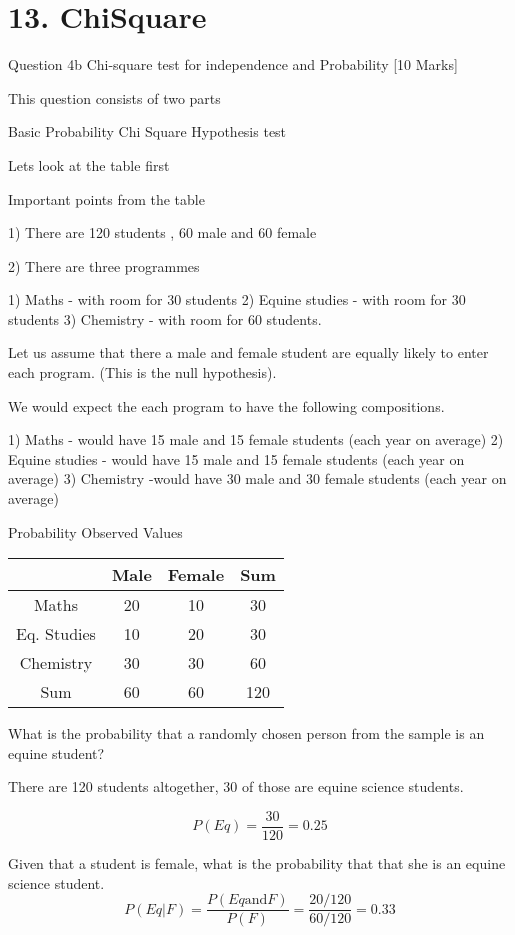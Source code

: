 			\chapter{13. ChiSquare}
			
			
			Question 4b  
			Chi-square test for independence and Probability [10 Marks]
			
			This question consists of two parts
			
			Basic Probability
			Chi Square Hypothesis test
			
			Lets look at the table first
			
			Important points from the table
			
			1) There are 120 students , 60 male and 60 female
			
			2) There are three programmes
			
			1) Maths - with room for 30 students
			2) Equine studies - with room for 30 students
			3) Chemistry - with room for 60 students.
			
			Let us assume that there a male and female student are equally likely to enter each program. (This is the null hypothesis).
			
			We would expect the each program to have the following compositions.
			
			1) Maths - would have 15 male and 15 female students (each year on average)
			2) Equine studies - would have 15 male and 15 female students (each year on average)
			3) Chemistry -would have 30 male and 30 female students (each year on average)
			
			
			Probability
			Observed Values


\begin{center}
	\begin{tabular}{cccc}
	&	Male	&	Female	&	Sum	\\ \hline
	Maths	&	20	&	10	&	30	\\ \hline
	Eq. Studies	&	10	&	20	&	30	\\ \hline
	Chemistry	&	30	&	30	&	60	\\ \hline
	Sum	&	60	&	60	&	120	\\ \hline

	\end{tabular}
\end{center}
			
			

			
			What is the probability that a randomly chosen person from the sample is an equine student?
			
			There are 120 students altogether, 30 of those are equine science students.
			
			\[P(Eq) = \frac{30}{120}= 0.25\]
			
			Given that a student is female, what is the probability that that she is an equine science student.
			\[P(Eq |F) = \frac{P(Eq \mbox{and} F)}{P(F)}= \frac{20/120}{60/120}= 0.33\]


			
			


